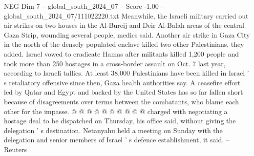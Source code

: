 \begin{textsample}{NEG Dim 7 – global\_south\_2024\_07 – Score -1.00 – global\_south\_2024\_07/111022220.txt}
Meanwhile, the Israeli military carried out air strikes on two houses in the Al-Bureij and Deir Al-Balah areas of the central Gaza Strip, wounding several people, medics said.
Another air strike in Gaza City in the north of the densely populated enclave killed two other Palestinians, they added.
Israel vowed to eradicate Hamas after militants killed 1,200 people and took more than 250 hostages in a cross-border assault on Oct. 7 last year, according to Israeli tallies.
At least 38,000 Palestinians have been killed in Israel ' s retaliatory offensive since then, Gaza health authorities say.
A ceasefire effort led by Qatar and Egypt and backed by the United States has so far fallen short because of disagreements over terms between the combatants, who blame each other for the impasse. @ @ @ @ @ @ @ @ @ @ charged with negotiating a hostage deal to be dispatched on Thursday, his office said, without giving the delegation ' s destination.
Netanyahu held a meeting on Sunday with the delegation and senior members of Israel ' s defence establishment, it said. -- Reuters

\end{textsample}
